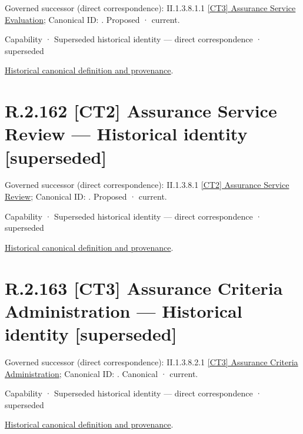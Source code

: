 {\small Governed successor (direct correspondence): II.1.3.8.1.1 \hyperref[element:039343518db542d48cde6afab84a3e1e]{[CT3] Assurance Service Evaluation}; Canonical ID: \texttt{}. Proposed · current.}\par
\label{element:be34b54314c6444f8418d645f6c83b6d}
{\small Capability · Superseded historical identity — direct correspondence · superseded}\par
\href{../../../../../../../continuum/strategy/capability/be34b54314c6444f8418d645f6c83b6d.md}{Historical canonical definition and provenance}.\par
\section*{R.2.162 [CT2] Assurance Service Review — Historical identity [superseded]}
\label{navigation:R.2.162}

{\small Governed successor (direct correspondence): II.1.3.8.1 \hyperref[element:b1a791458d644d4794895e4fa42ec83c]{[CT2] Assurance Service Review}; Canonical ID: \texttt{}. Proposed · current.}\par
\label{element:b345cb12b45746409302899514126170}
{\small Capability · Superseded historical identity — direct correspondence · superseded}\par
\href{../../../../../../../continuum/strategy/capability/b345cb12b45746409302899514126170.md}{Historical canonical definition and provenance}.\par
\section*{R.2.163 [CT3] Assurance Criteria Administration — Historical identity [superseded]}
\label{navigation:R.2.163}

{\small Governed successor (direct correspondence): II.1.3.8.2.1 \hyperref[element:1bfd71f24321428c8871b587d413f47e]{[CT3] Assurance Criteria Administration}; Canonical ID: \texttt{}. Canonical · current.}\par
\label{element:6dab08ab1e3249d7b314843ca9ed0149}
{\small Capability · Superseded historical identity — direct correspondence · superseded}\par
\href{../../../../../../../continuum/strategy/capability/6dab08ab1e3249d7b314843ca9ed0149.md}{Historical canonical definition and provenance}.\par
